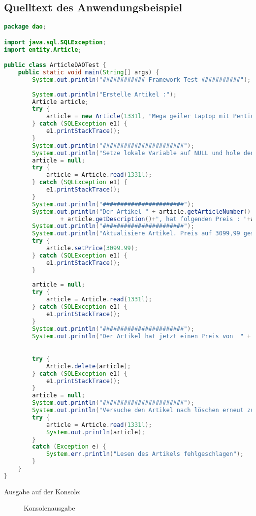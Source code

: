\clearpage
\subsection{Quelltext des Anwendungsbeispiel}
\begin{lstlisting}[language=java, style=java, caption={ArticleDAOTest.java},
label={lst:lst2}]
package dao;

import java.sql.SQLException;
import entity.Article;

public class ArticleDAOTest {
	public static void main(String[] args) {
		System.out.println("############ Framework Test ###########");
		
		System.out.println("Erstelle Artikel :");
        Article article;
		try {
			article = new Article(1331l, "Mega geiler Laptop mit Pentium 4 Prozessor", 2999.99);
		} catch (SQLException e1) {
			e1.printStackTrace();
		}
		System.out.println("#######################");
        System.out.println("Setze lokale Variable auf NULL und hole den Artikel zurueck:");
        article = null;
        try {
			article = Article.read(1331l);
		} catch (SQLException e1) {
			e1.printStackTrace();
		}
    	System.out.println("#######################");
        System.out.println("Der Artikel " + article.getArticleNumber() + " "
                + article.getDescription()+", hat folgenden Preis : "+article.getPrice());
    	System.out.println("#######################");        
        System.out.println("Aktualisiere Artikel. Preis auf 3099,99 gesetzt");
        try {
			article.setPrice(3099.99);
		} catch (SQLException e1) {
			e1.printStackTrace();
		}
        
        article = null;
        try {
			article = Article.read(1331l);
		} catch (SQLException e1) {
			e1.printStackTrace();
		}
    	System.out.println("#######################");
        System.out.println("Der Artikel hat jetzt einen Preis von  " + article.getPrice());

 
        try {
			Article.delete(article);
		} catch (SQLException e1) {
			e1.printStackTrace();
		}
        article = null;
    	System.out.println("#######################");
        System.out.println("Versuche den Artikel nach löschen erneut zu lesen: ");
        try {
            article = Article.read(1331l);
            System.out.println(article);
        }
        catch (Exception e) {
        	System.err.println("Lesen des Artikels fehlgeschlagen");
		}
	}
}
\end{lstlisting}

Ausgabe auf der Konsole:
\begin{figure}[htb]
	\centering
	\caption{Konsolenausgabe}
\end{figure}
\clearpage
